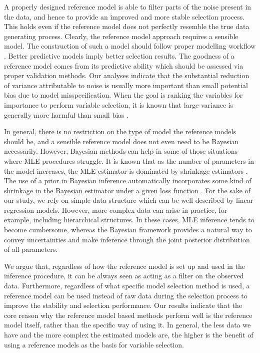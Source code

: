 \documentclass[a4]{article}
\theoremstyle{definition}
\begin{document}
A properly designed reference model is able to filter parts of the
noise present in the data, and hence to provide an improved and more
stable selection process. This holds even if the reference model does
not perfectly resemble the true data generating process. 
Clearly, the reference model approach requires a sensible model. 
The construction of such a model should follow proper modelling workflow \citep[see, e.g.][]{gelman2020bayesian}. Better predictive models imply better selection results. 
The goodness of a reference model comes from its predictive ability which should be 
assessed via proper validation methods. Our analyses indicate that the substantial 
reduction of variance attributable to noise is usually more important than small potential
bias due to model misspecification.
When the goal is ranking the variables for importance to
perform variable selection, it is known that large variance is
generally more harmful than small bias \citep{piironen2017comparison}.

In general, there is no restriction on the type of model the reference models should be, and a sensible reference model does not even need to be Bayesian necessarily.
However, Bayesian methods can help in some of those situations
where MLE procedures struggle. 
It is known that as the number of parameters in the model increases, the MLE
estimator is dominated by shrinkage estimators 
\citep{stein1956inadmissibility, stein1961estimation, parmigiani2009decision, efron2011tweedie}.
The use of a prior in Bayesian inference automatically incorporates 
some kind of shrinkage in the Bayesian estimator under a given loss function \citep[see, e.g.][]{rockova2012hierarchical}. 
For the sake of our study, we rely on simple data structure which can be well described 
by linear regression models. However, more complex data can arise in practice, for example, including hierarchical structures. In these cases, MLE inference tends to become cumbersome, whereas the Bayesian framework provides a natural way to convey uncertainties and make inference through the joint posterior distribution of all parameters.

We argue that, regardless of how
the reference model is set up and used in the inference procedure, it
can be always seen as acting as a filter on the observed
data. Furthermore, regardless of what specific model selection method
is used, a reference model can be used instead of raw data during the
selection process to improve the stability and selection
performance. Our results indicate that the core reason why the
reference model based methods perform well is the reference model
itself, rather than the specific way of using it.  In general, the
less data we have and the more complex the estimated models are, the
higher is the benefit of using a reference models as the basis for
variable selection.
\end{document}
